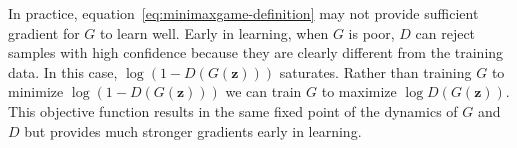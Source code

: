 \documentclass{article} %
\begin{document}
In practice, equation~\ref{eq:minimaxgame-definition} may not provide sufficient gradient for $G$ to learn
well. Early in learning, when $G$ is poor, $D$ can reject samples with high confidence because they are
clearly different from the training data. In this case, $\log ( 1- D(G(\bm{z})))$ saturates. Rather than
training $G$ to minimize $\log (1 - D(G(\bm{z})))$ we can train $G$ to maximize $\log D(G(\bm{z}))$.
This objective function results in the same fixed point of the dynamics of $G$ and $D$ but provides much
stronger gradients early in learning.


\end{document}
